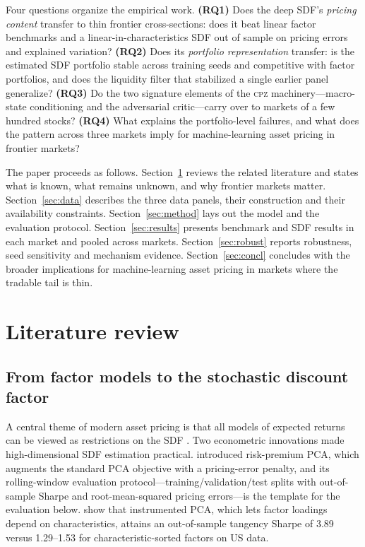 \documentclass[12pt]{article}
\begin{document}
Four questions organize the empirical work. \textbf{(RQ1)} Does the deep SDF's \emph{pricing content} transfer to thin frontier cross-sections: does it beat linear factor benchmarks and a linear-in-characteristics SDF out of sample on pricing errors and explained variation? \textbf{(RQ2)} Does its \emph{portfolio representation} transfer: is the estimated SDF portfolio stable across training seeds and competitive with factor portfolios, and does the liquidity filter that stabilized a single earlier panel generalize? \textbf{(RQ3)} Do the two signature elements of the \textsc{cpz} machinery---macro-state conditioning and the adversarial critic---carry over to markets of a few hundred stocks? \textbf{(RQ4)} What explains the portfolio-level failures, and what does the pattern across three markets imply for machine-learning asset pricing in frontier markets?

The paper proceeds as follows. Section~\ref{sec:lit} reviews the related literature and states what is known, what remains unknown, and why frontier markets matter. Section~\ref{sec:data} describes the three data panels, their construction and their availability constraints. Section~\ref{sec:method} lays out the model and the evaluation protocol. Section~\ref{sec:results} presents benchmark and SDF results in each market and pooled across markets. Section~\ref{sec:robust} reports robustness, seed sensitivity and mechanism evidence. Section~\ref{sec:concl} concludes with the broader implications for machine-learning asset pricing in markets where the tradable tail is thin.

\section{Literature review}\label{sec:lit}

\subsection{From factor models to the stochastic discount factor}

A central theme of modern asset pricing is that all models of expected returns can be viewed as restrictions on the SDF \citep{hj1991,cochrane2011}. Two econometric innovations made high-dimensional SDF estimation practical. \citet{lettaupelger2020} introduced risk-premium PCA, which augments the standard PCA objective with a pricing-error penalty, and its rolling-window evaluation protocol---training/validation/test splits with out-of-sample Sharpe and root-mean-squared pricing errors---is the template for the evaluation below. \citet{kps2019} show that instrumented PCA, which lets factor loadings depend on characteristics, attains an out-of-sample tangency Sharpe of 3.89 versus 1.29--1.53 for characteristic-sorted factors on US data.
\end{document}
